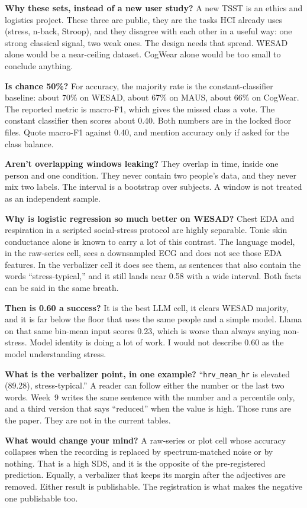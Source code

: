 \documentclass[11pt]{article}
\newcommand{\say}[1]{{\color{Ask}\textbf{#1}}}
\begin{document}
\say{Why these sets, instead of a new user study?}
A new TSST is an ethics and logistics project. These three are public, they are the tasks HCI already uses (stress, n-back, Stroop), and they disagree with each other in a useful way: one strong classical signal, two weak ones. The design needs that spread. WESAD alone would be a near-ceiling dataset. CogWear alone would be too small to conclude anything.

\say{Is chance 50\%?}
For accuracy, the majority rate is the constant-classifier baseline: about 70\% on WESAD, about 67\% on MAUS, about 66\% on CogWear. The reported metric is macro-F1, which gives the missed class a vote. The constant classifier then scores about 0.40. Both numbers are in the locked floor files. Quote macro-F1 against 0.40, and mention accuracy only if asked for the class balance.

\say{Aren't overlapping windows leaking?}
They overlap in time, inside one person and one condition. They never contain two people's data, and they never mix two labels. The interval is a bootstrap over subjects. A window is not treated as an independent sample.

\say{Why is logistic regression so much better on WESAD?}
Chest EDA and respiration in a scripted social-stress protocol are highly separable. Tonic skin conductance alone is known to carry a lot of this contrast. The language model, in the raw-series cell, sees a downsampled ECG and does not see those EDA features. In the verbalizer cell it does see them, as sentences that also contain the words ``stress-typical,'' and it still lands near 0.58 with a wide interval. Both facts can be said in the same breath.

\say{Then is 0.60 a success?}
It is the best LLM cell, it clears WESAD majority, and it is far below the floor that uses the same people and a simple model. Llama on that same bin-mean input scores 0.23, which is worse than always saying non-stress. Model identity is doing a lot of work. I would not describe 0.60 as the model understanding stress.

\say{What is the verbalizer point, in one example?}
``\texttt{hrv\_mean\_hr} is elevated (89.28), stress-typical.'' A reader can follow either the number or the last two words. Week~9 writes the same sentence with the number and a percentile only, and a third version that says ``reduced'' when the value is high. Those runs are the paper. They are not in the current tables.

\say{What would change your mind?}
A raw-series or plot cell whose accuracy collapses when the recording is replaced by spectrum-matched noise or by nothing. That is a high SDS, and it is the opposite of the pre-registered prediction. Equally, a verbalizer that keeps its margin after the adjectives are removed. Either result is publishable. The registration is what makes the negative one publishable too.
\end{document}
